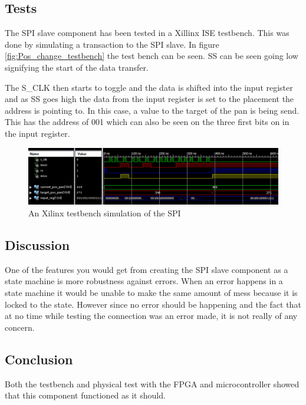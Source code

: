 \subsection{Tests}

The SPI slave component has been tested in a Xillinx ISE testbench. This was done by simulating a transaction to the SPI slave. In figure \ref{fig:Pos_change_testbench} the test bench can be seen. SS can be seen going low signifying the start of the data transfer.

\newpage

The S\_CLK then starts to toggle and the data is shifted into the input register and as SS goes high the data from the input register is set to the placement the address is pointing to. In this case, a value to the target of the pan is being send. This has the address of 001 which can also be seen on the three first bits on in the input register.

\begin{figure}[h!]
\centering
\includegraphics[scale=0.5]{Billeder/FPGA/SPI_Slave/Testbench_of_SPI.png}
\caption{ An Xilinx testbench simulation of the SPI }
\label{fig:Testbench_of_SPI}
\end{figure}



\subsection{Discussion}

One of the features you would get from creating the SPI slave component as a state machine is more robustness against errors. When an error happens in a state machine it would be unable to make the same amount of mess because it is locked to the state. However since no error should be happening and the fact that at no time while testing the connection was an error made, it is not really of any concern.

\subsection{Conclusion}

Both the testbench and physical test with the FPGA and microcontroller showed that this component functioned as it should.
